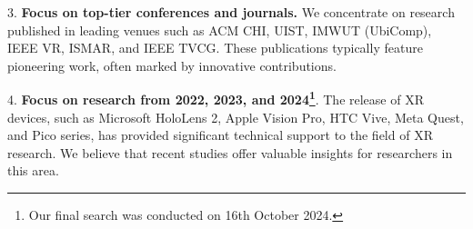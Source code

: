 \documentclass[review]{fcs}
\newcommand{\revise}[2]{\textcolor[rgb]{0,0,0}{#2}}
\begin{document}

3. \textbf{\revise{Focusing on top-tier conferences and journals.}{Focus on top-tier conferences and journals.}} \revise{We concentrated on research published in leading venues such as ACM CHI, UIST, IMWUT,  IEEE VR, ISMAR, and IEEE TVCG.}{We concentrate on research published in leading venues such as ACM CHI, UIST, IMWUT (UbiComp),  IEEE VR, ISMAR, and IEEE TVCG.} These publications typically feature pioneering work, often marked by innovative contributions.

4. \textbf{\revise{Focusing on research from 2022, 2023, and 2024}{Focus on research from 2022, 2023, and 2024}\footnote{Our final search was conducted on 16th October 2024.}}. \revise{The release of XR devices such as Microsoft HoloLens 2, Apple Vision Pro, HTC Vive, Meta Quest, and Pico series has provided significant technical support to the field of XR research.}{The release of XR devices, such as Microsoft HoloLens 2, Apple Vision Pro, HTC Vive, Meta Quest, and Pico series, has provided significant technical support to the field of XR research.} We believe that recent studies offer valuable insights for researchers in this area.
\end{document}
